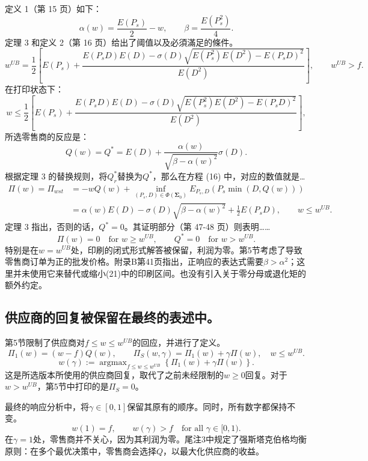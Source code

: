 \documentclass{article}
\begin{document}
定义 1（第 15 页）如下：
\[
\alpha(w)=\frac{E(P_s)}{2}-w,\qquad
\beta=\frac{E(P_s^2)}{4}.
\]
定理 3 和定义 2（第 16 页）给出了阈值以及必須滿足的條件。
\[
w^{UB}=\frac12\left[
E(P_s)+
\frac{E(P_sD)E(D)-\sigma(D)\sqrt{E(P_s^2)E(D^2)-E(P_sD)^2}}
{E(D^2)}
\right],\qquad w^{UB}>f.
\]
在打印状态下：
\begin{equation}
w\leq\frac12\left[
E(P_s)+
\frac{E(P_sD)E(D)-\sigma(D)\sqrt{E(P_s^2)E(D^2)-E(P_sD)^2}}
{E(D^2)}
\right],
\tag{17}
\end{equation}
所选零售商的反应是：
\begin{equation}
Q(w)=Q^*=E(D)+\frac{\alpha(w)}{\sqrt{\beta-\alpha(w)^2}}\sigma(D).
\tag{18}
\end{equation}
根据定理 3 的替换规则，将$Q_r^*$替换为$Q^*$，那么在方程 (16) 中，对应的数值就是…
\begin{equation}
\begin{aligned}
\Pi(w)=\Pi_{wst}
&=-wQ(w)+\inf_{(P_s,D)\in\Phi(\boldsymbol{\Sigma}_0)}
E_{P_s,D}\!\left(P_s\min(D,Q(w))\right)\\
&=\alpha(w)E(D)-\sigma(D)\sqrt{\beta-\alpha(w)^2}
+\frac12E(P_sD),\qquad w\leq w^{UB}.
\end{aligned}
\tag{16}
\end{equation}
定理 3 指出，否则的话，$Q^*=0$。其证明部分（第 47-48 页）则表明……
\[
\Pi(w)=0\quad\text{for }w\geq w^{UB},\qquad
Q^*=0\quad\text{for }w>w^{UB}.
\]
特别是在$w=w^{UB}$处，印刷的闭式形式解答被保留，利润为零。第5节考虑了导致零售商订单为正的批发价格。附录B第41页指出，正响应的表达式需要$\beta>\alpha^2$；这里并未使用它来替代或缩小(21)中的印刷区间。也没有引入关于零分母或退化矩的额外约定。

\subsection*{供应商的回复被保留在最终的表述中。}
第5节限制了供应商对$f\leq w\leq w^{UB}$的回应，并进行了定义。
\[
\Pi_1(w)=(w-f)Q(w),\qquad
\Pi_S(w,\gamma)=\Pi_1(w)+\gamma\Pi(w),\quad w\leq w^{UB}.
\]
\begin{equation}
w(\gamma):=\operatorname{argmax}_{f\leq w\leq w^{UB}}
\left\{\Pi_1(w)+\gamma\Pi(w)\right\}.
\tag{19}
\end{equation}
这是所选版本所使用的供应商回复，取代了之前未经限制的$w\geq0$回复。对于$w>w^{UB}$，第5节中打印的是$\Pi_S=0$。

最终的响应分析中，将$\gamma\in[0,1]$保留其原有的顺序。同时，所有数字都保持不变。
\[
w(1)=f,\qquad w(\gamma)>f\quad\text{for all }\gamma\in[0,1).
\]
在$\gamma=1$处，零售商并不关心，因为其利润为零。尾注3中规定了强斯塔克伯格均衡原则：在多个最优决策中，零售商会选择$Q$，以最大化供应商的收益。
\end{document}
